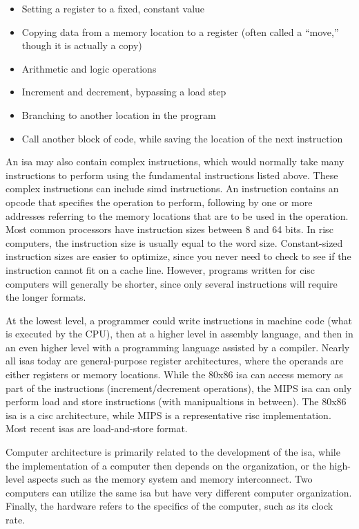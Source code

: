 \documentclass[10pt]{article}
\begin{document}
\begin{flushleft}
\begin{itemize}
\item Setting a register to a fixed, constant value
\item Copying data from a memory location to a register (often called a ``move,'' though it is actually a copy)
\item Arithmetic and logic operations
\item Increment and decrement, bypassing a load step
\item Branching to another location in the program
\item Call another block of code, while saving the location of the next instruction
\end{itemize}

An \gls{isa} may also contain complex instructions, which would normally take many instructions to perform using the fundamental instructions listed above. These complex instructions can include \gls{simd} instructions. An instruction contains an opcode that specifies the operation to perform, following by one or more addresses referring to the memory locations that are to be used in the operation. Most common processors have instruction sizes between 8 and 64 bits. In \gls{risc} computers, the instruction size is usually equal to the word size. Constant-sized instruction sizes are easier to optimize, since you never need to check to see if the instruction cannot fit on a cache line. However, programs written for \gls{cisc} computers will generally be shorter, since only several instructions will require the longer formats. 

At the lowest level, a programmer could write instructions in machine code (what is executed by the CPU), then at a higher level in assembly language, and then in an even higher level with a programming language assisted by a compiler. Nearly all \gls{isa}s today are general-purpose register architectures, where the operands are either registers or memory locations. While the 80x86 \gls{isa} can access memory as part of the instructions (increment/decrement operations), the MIPS \gls{isa} can only perform load and store instructions (with manipualtions in between). The 80x86 \gls{isa} is a \gls{cisc} architecture, while MIPS is a representative \gls{risc} implementation. Most recent \gls{isa}s are load-and-store format. 

Computer architecture is primarily related to the development of the \gls{isa}, while the implementation of a computer then depends on the organization, or the high-level aspects such as the memory system and memory interconnect. Two computers can utilize the same \gls{isa} but have very different computer organization. Finally, the hardware refers to the specifics of the computer, such as its clock rate. 


\end{flushleft}
\end{document}

